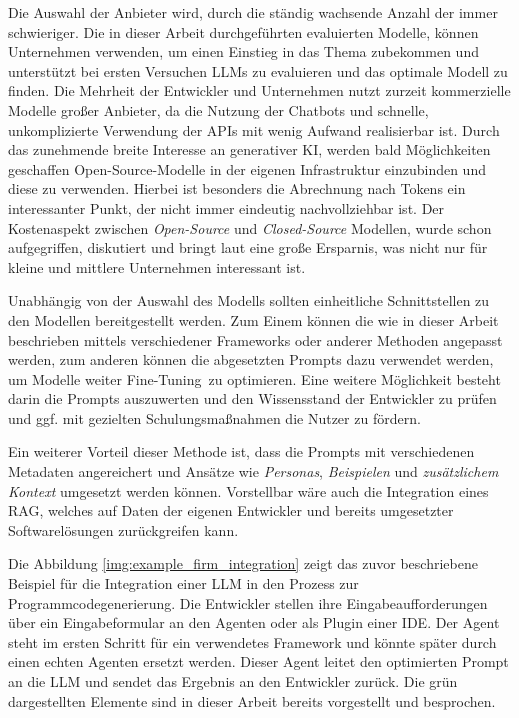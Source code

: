 Die Auswahl der Anbieter wird, durch die ständig wachsende Anzahl der immer schwieriger. Die in dieser Arbeit durchgeführten evaluierten Modelle, können Unternehmen verwenden, um einen Einstieg in das Thema zubekommen und unterstützt bei ersten Versuchen LLMs zu evaluieren und das optimale Modell zu finden. Die Mehrheit der Entwickler und Unternehmen nutzt zurzeit kommerzielle Modelle großer Anbieter, da die Nutzung der Chatbots und schnelle, unkomplizierte Verwendung der APIs mit wenig Aufwand realisierbar ist. Durch das zunehmende breite Interesse an generativer KI, werden bald Möglichkeiten geschaffen Open-Source-Modelle in der eigenen Infrastruktur einzubinden und diese zu verwenden. Hierbei ist besonders die Abrechnung nach Tokens ein interessanter Punkt, der nicht immer eindeutig nachvollziehbar ist. Der Kostenaspekt zwischen \textit{Open-Source} und \textit{Closed-Source} Modellen, wurde schon aufgegriffen, diskutiert und bringt laut \cite{irugalbandara-2023} eine große Ersparnis, was nicht nur für kleine und mittlere Unternehmen interessant ist.\vspace{0.2cm}

Unabhängig von der Auswahl des Modells sollten einheitliche Schnittstellen zu den Modellen bereitgestellt werden. Zum Einem können die wie in dieser Arbeit beschrieben mittels verschiedener Frameworks oder anderer Methoden angepasst werden, zum anderen können die abgesetzten Prompts dazu verwendet werden, um Modelle weiter \glqq Fine-Tuning\grqq \ zu optimieren. Eine weitere Möglichkeit besteht darin die Prompts auszuwerten und den Wissensstand der Entwickler zu prüfen und ggf. mit gezielten Schulungsmaßnahmen die Nutzer zu fördern.\vspace{0.2cm}

Ein weiterer Vorteil dieser Methode ist, dass die Prompts mit verschiedenen Metadaten angereichert und Ansätze wie \textit{Personas}, \textit{Beispielen} und \textit{zusätzlichem Kontext} umgesetzt werden können. Vorstellbar wäre auch die Integration eines RAG, welches auf Daten der eigenen Entwickler und bereits umgesetzter Softwarelösungen zurückgreifen kann.\vspace{0.2cm}

Die Abbildung \ref{img:example_firm_integration} zeigt das zuvor beschriebene Beispiel für die Integration einer LLM in den Prozess zur Programmcodegenerierung. Die Entwickler stellen ihre Eingabeaufforderungen über ein Eingabeformular an den Agenten oder als Plugin einer IDE. Der Agent steht im ersten Schritt für ein verwendetes Framework und könnte später durch einen echten Agenten ersetzt werden. Dieser Agent leitet den optimierten Prompt an die LLM und sendet das Ergebnis an den Entwickler zurück. Die grün dargestellten Elemente sind in dieser Arbeit bereits vorgestellt und besprochen.\vspace{0.2cm}

